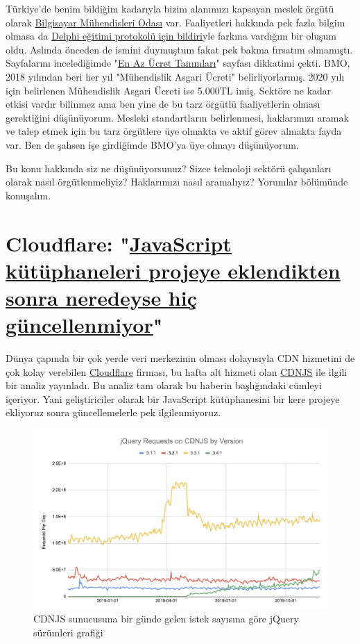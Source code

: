 \documentclass[11pt]{article}
\begin{document}
Türkiye'de benim bildiğim kadarıyla bizim alanımızı kapsayan meslek örgütü
olarak \href{https://www.bmo.org.tr/}{Bilgisayar Mühendisleri Odası} var. Faaliyetleri hakkında pek fazla
bilgim olmasa da \href{https://www.bmo.org.tr/2020/01/23/mebin-teknik-liselerde-yazilim-egitimi-yontemi-cagdisidir/}{Delphi eğitimi protokolü için bildiri}yle farkına vardığım bir
oluşum oldu. Aslında önceden de ismini duymuştum fakat pek bakma fırsatım
olmamıştı. Sayfalarını incelediğimde "\href{https://www.bmo.org.tr/en-az-ucret/}{En Az Ücret Tanımları}" sayfası dikkatimi
çekti. BMO, 2018 yılından beri her yıl "Mühendislik Asgari Ücreti"
belirliyorlarmış. 2020 yılı için belirlenen Mühendislik Asgari Ücreti ise
5.000TL imiş. Sektöre ne kadar etkisi vardır bilinmez ama ben yine de bu tarz
örgütlü faaliyetlerin olması gerektiğini düşünüyorum. Mesleki standartların
belirlenmesi, haklarımızı aramak ve talep etmek için bu tarz örgütlere üye
olmakta ve aktif görev almakta fayda var. Ben de şahsen işe girdiğimde BMO'ya
üye olmayı düşünüyorum.

Bu konu hakkında siz ne düşünüyorsunuz? Sizce teknoloji sektörü çalışanları
olarak nasıl örgütlenmeliyiz? Haklarımızı nasıl aramalıyız? Yorumlar bölümünde
konuşalım.
\section{Cloudflare: "\href{https://blog.cloudflare.com/javascript-libraries-are-almost-never-updated/}{JavaScript kütüphaneleri projeye eklendikten sonra neredeyse hiç güncellenmiyor}"}
\label{sec:org13fde77}
Dünya çapında bir çok yerde veri merkezinin olması dolayısıyla CDN hizmetini
de çok kolay verebilen \href{https://www.cloudflare.com/}{Cloudflare} firması, bu hafta alt hizmeti olan \href{https://cdnjs.com/}{CDNJS} ile
ilgili bir analiz yayınladı. Bu analiz tam olarak bu haberin başlığındaki
cümleyi içeriyor. Yani geliştiriciler olarak bir JavaScript kütüphanesini bir
kere projeye ekliyoruz sonra güncellemelerle pek ilgilenmiyoruz.

\begin{figure}[htbp]
\centering
\includegraphics[width=.9\linewidth]{gorseller/cloudflare-jquery-1.png}
\caption{CDNJS sunucusuna bir günde gelen istek sayısına göre jQuery sürümleri grafiği}
\end{figure}
\end{document}
